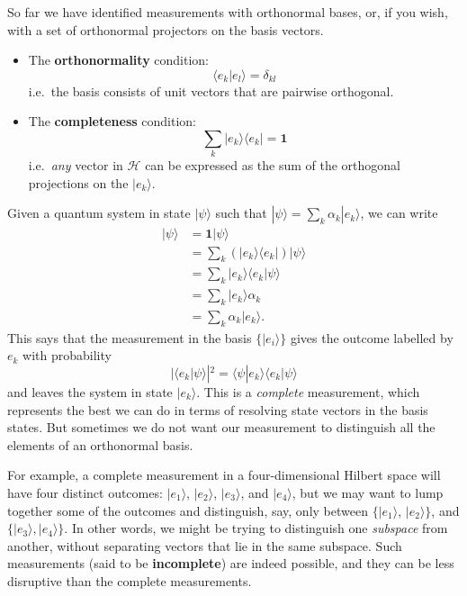\documentclass[fleqn]{article}
\providecommand{\tightlist}{%
  \setlength{\itemsep}{0pt}\setlength{\parskip}{0pt}}
\newenvironment{idea}{\noindent}{\medskip}
\begin{document}
So far we have identified measurements with orthonormal bases, or, if you wish, with a set of orthonormal projectors on the basis vectors.

\begin{idea}

\begin{itemize}
\tightlist
\item
  The \textbf{orthonormality} condition:
  \[
      \langle e_k|e_l\rangle = \delta_{kl}
    \]
  i.e.~the basis consists of unit vectors that are pairwise orthogonal.
\item
  The \textbf{completeness} condition:
  \[
      \sum_k|e_k\rangle\langle e_k| = \mathbf{1}
    \]
  i.e.~\emph{any} vector in \(\mathcal{H}\) can be expressed as the sum of the orthogonal projections on the \(|e_k\rangle\).
\end{itemize}

\end{idea}

Given a quantum system in state \(|\psi\rangle\) such that \(|\psi\rangle = \sum_k \alpha_k|e_k\rangle\), we can write
\[
  \begin{aligned}
    |\psi\rangle
    &= \mathbf{1}|\psi\rangle
  \\&= \sum_k (|e_k\rangle\langle e_k|) |\psi\rangle
  \\&= \sum_k |e_k\rangle\langle e_k|\psi\rangle
  \\&= \sum_k |e_k\rangle\alpha_k
  \\&= \sum_k \alpha_k|e_k\rangle.
  \end{aligned}
\]
This says that the measurement in the basis \(\{|e_i\rangle\}\) gives the outcome labelled by \(e_k\) with probability
\[
  |\langle e_k|\psi\rangle|^2 = \langle\psi|e_k\rangle\langle e_k|\psi\rangle
\]
and leaves the system in state \(|e_k\rangle\).
This is a \emph{complete} measurement, which represents the best we can do in terms of resolving state vectors in the basis states.
But sometimes we do not want our measurement to distinguish all the elements of an orthonormal basis.

For example, a complete measurement in a four-dimensional Hilbert space will have four distinct outcomes: \(|e_1\rangle\), \(|e_2\rangle\), \(|e_3\rangle\), and \(|e_4\rangle\), but we may want to lump together some of the outcomes and distinguish, say, only between \(\{|e_1\rangle\), \(|e_2\rangle\}\), and \(\{|e_3\rangle,|e_4\rangle\}\).
In other words, we might be trying to distinguish one \emph{subspace} from another, without separating vectors that lie in the same subspace.
Such measurements (said to be \textbf{incomplete}) are indeed possible, and they can be less disruptive than the complete measurements.
\end{document}
